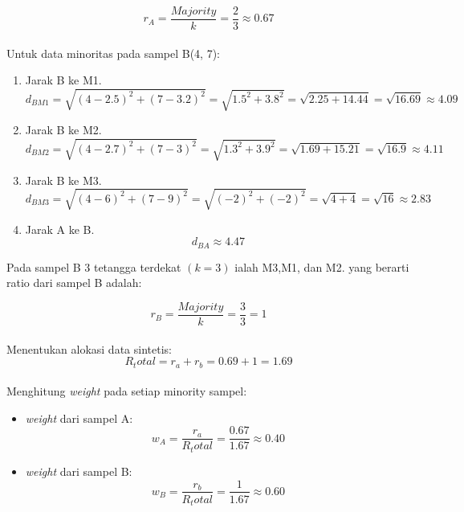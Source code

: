 $$
r_A = \frac{Majority}{k} = \frac{2}{3} \approx 0.67
$$
\\
Untuk data minoritas pada sampel B(4, 7):
\begin{enumerate}
	\item  Jarak B ke M1.\\
		$$
			d_{BM1} = \sqrt{(4-2.5)^2 + (7-3.2)^2} = \sqrt{1.5^2 + 3.8^2} = \sqrt{2.25 + 14.44} = \sqrt{16.69} \approx 4.09
		$$

	\item Jarak B ke M2.\\
		$$
		d_{BM2} = \sqrt{(4-2.7)^2 + (7-3)^2} = \sqrt{1.3^2 + 3.9^2} = \sqrt{1.69 + 15.21} = \sqrt{16.9} \approx 4.11 
		$$

	\item Jarak B ke M3.\\
		$$
			d_{BM3} = \sqrt{(4-6)^2 + (7-9)^2} = \sqrt{(-2)^2 + (-2)^2} = \sqrt{4 + 4} = \sqrt{16} \approx 2.83 
		$$
		
	\item Jarak A ke B.\\
		$$
			d_{BA}  \approx 4.47 
		$$
\end{enumerate}
Pada sampel B 3 tetangga terdekat $(k = 3)$ ialah M3,M1, dan M2. yang berarti ratio dari sampel B adalah:

$$
r_B = \frac{Majority}{k} = \frac{3}{3} = 1 
$$
\\
Menentukan alokasi data sintetis:\\
$$
R_total = r_a + r_b = 0.69 + 1 = 1.69
$$
\\
Menghitung \textit{weight} pada setiap minority sampel:

\begin{itemize}
	\item \textit{weight} dari sampel A: \\ 
		$$
			w_A = \frac{r_a}{R_total} = \frac{0.67}{1.67} \approx 0.40
		$$
	\item \textit{weight} dari sampel B:\\
		$$
			w_B = \frac{r_b}{R_total} = \frac{1}{1.67} \approx 0.60
		$$
\end{itemize}

